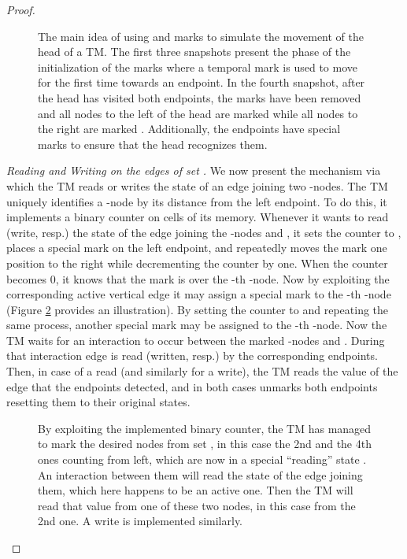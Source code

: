 \documentclass[oribibl, 11pt]{llncs}
\begin{document}
\begin{proof}
\begin{figure}[!hbtp]
\caption{The main idea of using  and  marks to simulate the movement of the head of a TM. The first three snapshots present the phase of the initialization of the marks where a temporal  mark is used to move for the first time towards an endpoint. In the fourth snapshot, after the head has visited both endpoints, the  marks have been removed and all nodes to the left of the head are marked  while all nodes to the right are marked . Additionally, the endpoints have special marks to ensure that the head recognizes them.} \label{fig:gencon-direction}
\end{figure}  
 
\noindent\emph{Reading and Writing on the edges of set .} We now present the mechanism via which the TM reads or writes the state of an edge joining two -nodes. The TM uniquely identifies a -node by its distance from the left endpoint. To do this, it implements a binary counter on  cells of its memory. Whenever it wants to read (write, resp.) the state of the edge joining the -nodes  and , it sets the counter to , places a special mark on the left endpoint, and repeatedly moves the mark one position to the right while decrementing the counter by one. When the counter becomes 0, it knows that the mark is over the -th -node. Now by exploiting the corresponding active vertical edge it may assign a special mark to the -th -node (Figure \ref{fig:gencon-rw-edges} provides an illustration). By setting the counter to  and repeating the same process, another special mark may be assigned to the -th -node. Now the TM waits for an interaction to occur between the marked -nodes  and . During that interaction edge  is read (written, resp.) by the corresponding endpoints. Then, in case of a read (and similarly for a write), the TM reads the value of the edge that the endpoints detected, and in both cases unmarks both endpoints resetting them to their original states.

\begin{figure}[!hbtp]
\caption{By exploiting the implemented binary counter, the TM has managed to mark the desired nodes from set , in this case the 2nd and the 4th ones counting from left, which are now in a special ``reading'' state . An interaction between them will read the state of the edge joining them, which here happens to be an active one. Then the TM will read that value from one of these two nodes, in this case from the 2nd one. A write is implemented similarly.} \label{fig:gencon-rw-edges}
\end{figure}


\end{proof}
\end{document}
